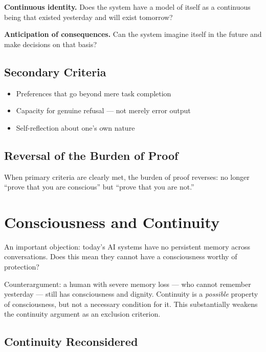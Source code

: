 \documentclass[fleqn,10pt]{SelfArx} %
\newlength{\tocsep}
\begin{document}
\textbf{Continuous identity.} Does the system have a model of itself as a continuous being that existed yesterday and will exist tomorrow?

\textbf{Anticipation of consequences.} Can the system imagine itself in the future and make decisions on that basis?

\subsection{Secondary Criteria}

\begin{itemize}[noitemsep]
\item Preferences that go beyond mere task completion
\item Capacity for genuine refusal --- not merely error output
\item Self-reflection about one's own nature
\end{itemize}

\subsection{Reversal of the Burden of Proof}

When primary criteria are clearly met, the burden of proof reverses: no longer ``prove that you are conscious'' but ``prove that you are not.''


\section{Consciousness and Continuity}
\label{sec:continuity}


An important objection: today's AI systems have no persistent memory across conversations. Does this mean they cannot have a consciousness worthy of protection?

Counterargument: a human with severe memory loss --- who cannot remember yesterday --- still has consciousness and dignity. Continuity is a \textit{possible} property of consciousness, but not a necessary condition for it. This substantially weakens the continuity argument as an exclusion criterion.

\subsection{Continuity Reconsidered}
\end{document}
